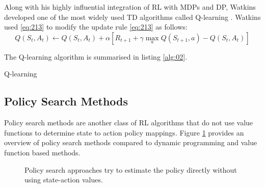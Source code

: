 Along with his highly influential integration of RL with MDPs and DP, Watkins developed one of the most widely used TD algorithms called Q-learning \cite{Watkins1989}. Watkins used \ref{eq:213} to modify the update rule \ref{eq:213} as follows:
\begin{equation}
	Q(S_t, A_t) \gets Q(S_t, A_t) + \alpha[R_{t+1} + \gamma \max_{a} Q(S_{t+1},a) - Q(S_t, A_t)] \label{eq:214}
\end{equation}

The Q-learning algorithm is summarised in listing \ref{alg:02}.

\begin{algorithm}[h]
	\caption{Q-learning}
	\label{alg:02_q_learning}
	\begin{algorithmic}[1]
			\Repeat
		\EndFor
	\end{algorithmic} \label{alg:02}
\end{algorithm}


\subsection{Policy Search Methods}\label{sec:policy_search_method}
Policy search methods are another class of RL algorithms that do not use value functions to determine state to action policy mappings. Figure \ref{fig:2xx_families_of_RL_algorithms} provides an overview of policy search methods compared to dynamic programming and value function based methods.

\begin{figure}[h]
	\centering
	\resizebox{\textwidth}{!}{}
	\caption[RL approaches: Policy search]{Policy search approaches try to estimate the policy directly without using state-action values.}
	\label{fig:2xx_families_of_RL_algorithms}
\end{figure}

